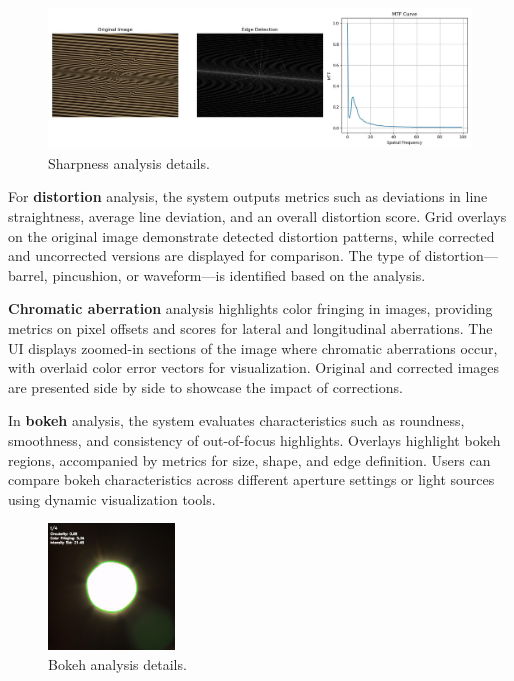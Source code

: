 \begin{figure}[h]
\centering
\includegraphics[width=1\textwidth]{Images/sharpness_image_result.jpg}
\caption{Sharpness analysis details.}
\label{fig:ui_sharpness_image}
\end{figure}

For \textbf{distortion} analysis, the system outputs metrics such as deviations in line straightness, average line deviation, and an overall distortion score. Grid overlays on the original image demonstrate detected distortion patterns, while corrected and uncorrected versions are displayed for comparison. The type of distortion—barrel, pincushion, or waveform—is identified based on the analysis.

\textbf{Chromatic aberration} analysis highlights color fringing in images, providing metrics on pixel offsets and scores for lateral and longitudinal aberrations. The UI displays zoomed-in sections of the image where chromatic aberrations occur, with overlaid color error vectors for visualization. Original and corrected images are presented side by side to showcase the impact of corrections.

In \textbf{bokeh} analysis, the system evaluates characteristics such as roundness, smoothness, and consistency of out-of-focus highlights. Overlays highlight bokeh regions, accompanied by metrics for size, shape, and edge definition. Users can compare bokeh characteristics across different aperture settings or light sources using dynamic visualization tools.

\begin{figure}[h]
\centering
\includegraphics[width=0.3\textwidth]{Images/bokeh_image_result.jpg}
\caption{Bokeh analysis details.}
\label{fig:ui_bokeh_image}
\end{figure}

